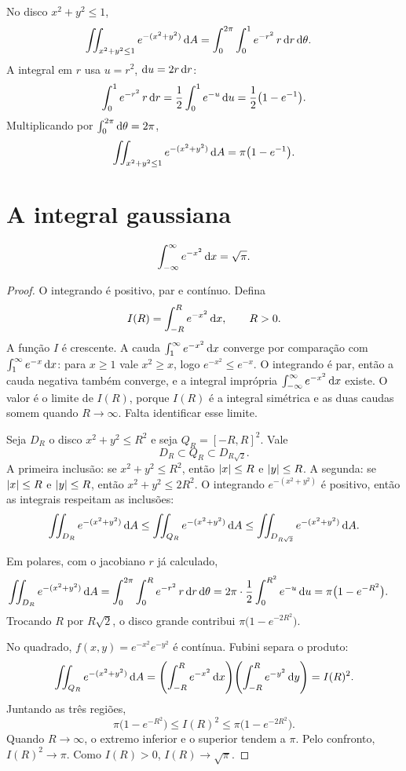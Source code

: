 \documentclass[11pt,a4paper]{article}
\begin{document}
\begin{exemplo}
No disco $x^2+y^2\le 1$,
\begin{align*}
\iint_{x^2+y^2\le 1} e^{-(x^2+y^2)}\,\mathrm{d} A
&=\int_0^{2\pi}\int_0^1 e^{-r^2}\,r\,\mathrm{d} r\,\mathrm{d}\theta.
\end{align*}
A integral em $r$ usa $u=r^2$, $\mathrm{d} u=2r\,\mathrm{d} r$:
\[
\int_0^1 e^{-r^2}\,r\,\mathrm{d} r=\frac12\int_0^1 e^{-u}\,\mathrm{d} u=\frac12\bigl(1-e^{-1}\bigr).
\]
Multiplicando por $\int_0^{2\pi}\mathrm{d}\theta=2\pi$,
\[
\iint_{x^2+y^2\le 1} e^{-(x^2+y^2)}\,\mathrm{d} A=\pi\bigl(1-e^{-1}\bigr).
\]
\end{exemplo}

\section{A integral gaussiana}

\begin{teorema}
\[
\int_{-\infty}^{\infty} e^{-x^2}\,\mathrm{d} x=\sqrt{\pi}.
\]
\end{teorema}

\begin{proof}
O integrando é positivo, par e contínuo. Defina
\[
I(R)=\int_{-R}^{R} e^{-x^2}\,\mathrm{d} x,\qquad R>0.
\]
A função $I$ é crescente. A cauda $\int_1^{\infty} e^{-x^2}\,\mathrm{d} x$ converge por comparação com $\int_1^{\infty} e^{-x}\,\mathrm{d} x$: para $x\ge 1$ vale $x^2\ge x$, logo $e^{-x^2}\le e^{-x}$. O integrando é par, então a cauda negativa também converge, e a integral imprópria $\int_{-\infty}^{\infty} e^{-x^2}\,\mathrm{d} x$ existe. O valor é o limite de $I(R)$, porque $I(R)$ é a integral simétrica e as duas caudas somem quando $R\to\infty$. Falta identificar esse limite.

Seja $D_R$ o disco $x^2+y^2\le R^2$ e seja $Q_R=[-R,R]^2$. Vale
\[
D_R\subset Q_R\subset D_{R\sqrt{2}}.
\]
A primeira inclusão: se $x^2+y^2\le R^2$, então $\left\lvert x \right\rvert\le R$ e $\left\lvert y \right\rvert\le R$. A segunda: se $\left\lvert x \right\rvert\le R$ e $\left\lvert y \right\rvert\le R$, então $x^2+y^2\le 2R^2$. O integrando $e^{-(x^2+y^2)}$ é positivo, então as integrais respeitam as inclusões:
\[
\iint_{D_R} e^{-(x^2+y^2)}\,\mathrm{d} A
\le\iint_{Q_R} e^{-(x^2+y^2)}\,\mathrm{d} A
\le\iint_{D_{R\sqrt{2}}} e^{-(x^2+y^2)}\,\mathrm{d} A.
\]

Em polares, com o jacobiano $r$ já calculado,
\begin{align*}
\iint_{D_R} e^{-(x^2+y^2)}\,\mathrm{d} A
&=\int_0^{2\pi}\int_0^R e^{-r^2}\,r\,\mathrm{d} r\,\mathrm{d}\theta
=2\pi\cdot\frac12\int_0^{R^2} e^{-u}\,\mathrm{d} u
=\pi\bigl(1-e^{-R^2}\bigr).
\end{align*}
Trocando $R$ por $R\sqrt{2}$, o disco grande contribui $\pi\bigl(1-e^{-2R^2}\bigr)$.

No quadrado, $f(x,y)=e^{-x^2}e^{-y^2}$ é contínua. Fubini separa o produto:
\[
\iint_{Q_R} e^{-(x^2+y^2)}\,\mathrm{d} A
=\Biggl(\int_{-R}^{R} e^{-x^2}\,\mathrm{d} x\Biggr)
\Biggl(\int_{-R}^{R} e^{-y^2}\,\mathrm{d} y\Biggr)
=I(R)^2.
\]
Juntando as três regiões,
\[
\pi\bigl(1-e^{-R^2}\bigr)
\le I(R)^2
\le\pi\bigl(1-e^{-2R^2}\bigr).
\]
Quando $R\to\infty$, o extremo inferior e o superior tendem a $\pi$. Pelo confronto, $I(R)^2\to\pi$. Como $I(R)>0$, $I(R)\to\sqrt{\pi}$.
\end{proof}
\end{document}
